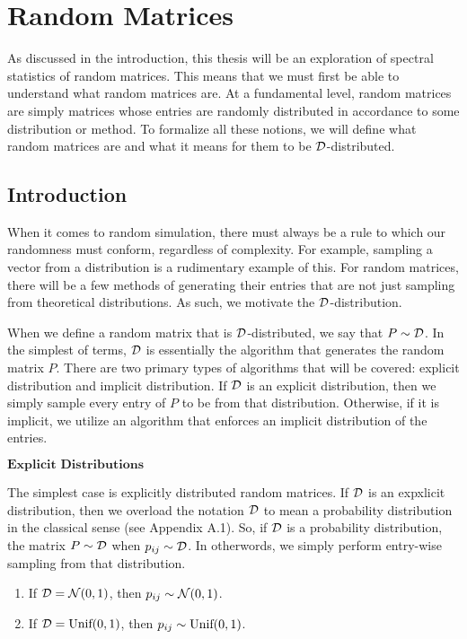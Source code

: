 \chapter{Random Matrices}

As discussed in the introduction, this thesis will be an exploration of spectral statistics of random matrices. This means that we must first be able to understand what random matrices are. At a fundamental level, random matrices are simply matrices whose entries are randomly distributed in accordance to some distribution or method. To formalize all these notions, we will define what random matrices are and what it means for them to be $\D$-distributed.

\section{Introduction}
When it comes to random simulation, there must always be a rule to which our randomness must conform, regardless of complexity. For example, sampling a vector from a distribution is a rudimentary example of this. For random matrices, there will be a few methods of generating their entries that are not just sampling from theoretical distributions. As such, we motivate the $\D$-distribution.

\begin{definition}[$\D$-distribution]
When we define a random matrix that is $\D$-distributed, we say that $P \sim \mathcal{D}$. In the simplest of terms, $\D$ is essentially the algorithm that generates the random matrix $P$. There are two primary types of algorithms that will be covered: explicit distribution and implicit distribution. If $\D$ is an explicit distribution, then we simply sample every entry of $P$ to be from that distribution. Otherwise, if it is implicit, we utilize an algorithm that enforces an implicit distribution of the entries. 
\end{definition}


$\textbf{Explicit Distributions}$ \hfill

The simplest case is explicitly distributed random matrices. If $\D$ is an expxlicit distribution, then we overload the notation $\D$ to mean a probability distribution in the classical sense (see Appendix A.1). So, if $\D$ is a probability distribution, the matrix $P \sim \mathcal{D}$ when $p_{ij} \sim \mathcal{D}$. In otherwords, we simply perform entry-wise sampling from that distribution.

\begin{enumerate}
\item  If $\mathcal{D} = \mathcal{N}(0,1)$, then $p_{ij} \sim \mathcal{N}(0,1)$.
\item  If $\mathcal{D} = \text{Unif}(0,1)$, then $p_{ij} \sim \text{Unif}(0,1)$.
\end{enumerate}

